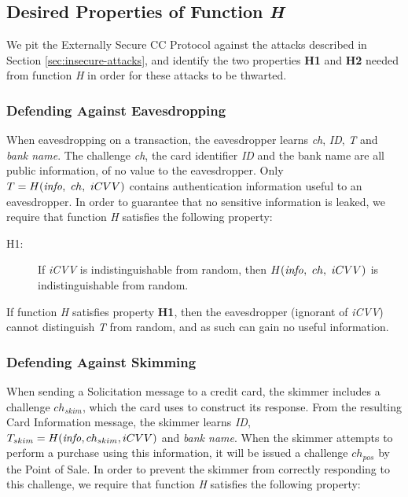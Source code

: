 \subsection{Desired Properties of Function \emph{H}}
\label{external-h-properties}

We pit the Externally Secure CC Protocol against the attacks described in Section \ref{sec:insecure-attacks},
	and identify the two properties \textbf{H1} and \textbf{H2} needed from function \emph{H} in order for these attacks to be thwarted.

\subsubsection*{Defending Against Eavesdropping}
When eavesdropping on a transaction, the eavesdropper learns \emph{ch}, \emph{ID}, \emph{T} and \emph{bank name}.
The challenge \emph{ch}, the card identifier \emph{ID} and the bank name are all public information, of no value to the eavesdropper.
Only $T = H(\textrm{\emph{info}},~ ch,~ iCVV)$ contains authentication information useful to an eavesdropper.
In order to guarantee that no sensitive information is leaked, we require that function \emph{H} satisfies the following property:

\begin{description}
\item[H1:] If \emph{iCVV} is indistinguishable from random, then $H(\textrm{\emph{info}},~ ch,~ iCVV)$ is indistinguishable from random.
\end{description}

If function \emph{H} satisfies property \textbf{H1}, then the eavesdropper (ignorant of \emph{iCVV}) cannot distinguish \emph{T} from random, and as such can gain no useful information.








\subsubsection*{Defending Against Skimming}
When sending a Solicitation message to a credit card, the skimmer includes a challenge $ch_{skim}$, which the card uses to construct its response.
From the resulting Card Information message, the skimmer learns \emph{ID}, $T_{skim} = H(\textrm{\emph{info}}, ch_{skim}, iCVV)$ and \emph{bank name}.
When the skimmer attempts to perform a purchase using this information, it will be issued a challenge $ch_{pos}$ by the Point of Sale.
In order to prevent the skimmer from correctly responding to this challenge, we require that function \emph{H} satisfies the following property:

